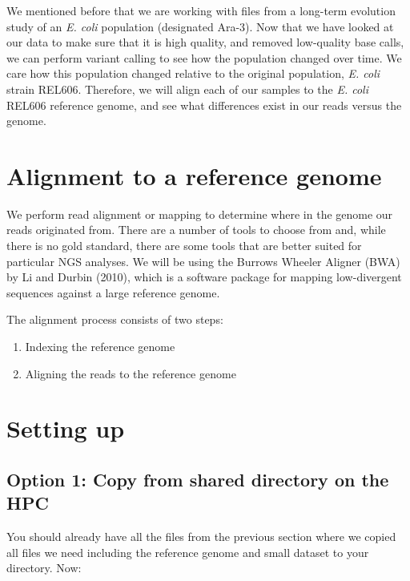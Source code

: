 \documentclass[
  letterpaper,
  DIV=11,
  numbers=noendperiod]{scrreprt}
\providecommand{\tightlist}{%
  \setlength{\itemsep}{0pt}\setlength{\parskip}{0pt}}\usepackage{longtable,booktabs,array}
\begin{document}
We mentioned before that we are working with files from a long-term
evolution study of an \emph{E. coli} population (designated Ara-3). Now
that we have looked at our data to make sure that it is high quality,
and removed low-quality base calls, we can perform variant calling to
see how the population changed over time. We care how this population
changed relative to the original population, \emph{E. coli} strain
REL606. Therefore, we will align each of our samples to the \emph{E.
coli} REL606 reference genome, and see what differences exist in our
reads versus the genome.

\hypertarget{alignment-to-a-reference-genome}{%
\section{Alignment to a reference
genome}\label{alignment-to-a-reference-genome}}

We perform read alignment or mapping to determine where in the genome
our reads originated from. There are a number of tools to choose from
and, while there is no gold standard, there are some tools that are
better suited for particular NGS analyses. We will be using the Burrows
Wheeler Aligner (BWA) by Li and Durbin (2010), which is a software
package for mapping low-divergent sequences against a large reference
genome.

The alignment process consists of two steps:

\begin{enumerate}
\def\labelenumi{\arabic{enumi}.}
\tightlist
\item
  Indexing the reference genome
\item
  Aligning the reads to the reference genome
\end{enumerate}

\hypertarget{setting-up}{%
\section{Setting up}\label{setting-up}}

\hypertarget{option-1-copy-from-shared-directory-on-the-hpc}{%
\subsection{Option 1: Copy from shared directory on the
HPC}\label{option-1-copy-from-shared-directory-on-the-hpc}}

You should already have all the files from the previous section where we
copied all files we need including the reference genome and small
dataset to your directory. Now:
\end{document}
